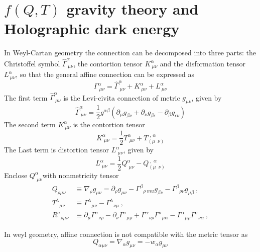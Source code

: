 \documentclass[linenumbers]{aastex631}
\begin{document}
\section{$f(Q,T)$ gravity theory and Holographic dark energy}
In Weyl-Cartan geometry the connection can be decomposed into three parts: the Christoffel symbol $\hat{\Gamma}^\alpha_{\ \mu \nu}$, the contortion tensor $K^\alpha_{\ \mu \nu}$ and the disformation tensor $L^\alpha_{\ \mu \nu}$, so that the general affine connection can be expressed as
\begin{equation}
    \Gamma^\alpha_{\ \mu \nu}=\hat{\Gamma}^\alpha_{\ \mu \nu}+K^\alpha_{\ \mu \nu}+L^\alpha_{\ \mu \nu}
\end{equation}
The first term $\hat{\Gamma}^\alpha_{\ \mu \nu}$ is the Levi-civita connection of metric $g_{\mu\nu}$, given by
\begin{equation}
\hat{\Gamma}^\alpha_{\ \mu \nu}=\frac{1}{2}g^{\alpha \beta}(\partial_\mu g_{\beta \nu}+\partial_\nu g_{\beta \epsilon}-\partial_\beta g_{\epsilon \nu})
\end{equation}
The second term $K^\alpha_{\ \mu \nu}$ is the contortion tensor 
\begin{equation}
 K^{\alpha}_{\,\,\mu\nu} =\frac{1}{2}T^{\alpha}_{\,\,\mu\nu} +T^{\,\ ,\,\alpha}_{(\mu\,\,\,\nu)}
\end{equation}
The Last term is distortion tensor $L^{\alpha}_{\,\,\mu\nu}$, given by
\begin{equation}
L^{\alpha}_{\,\,\mu\nu} = \frac{1}{2}Q^{\alpha}_{\,\,\mu\nu}-Q^{\ ,\,\,\alpha}_{(\mu\,\,\,\nu)}
\end{equation}
Enclose $Q^{\alpha}_{\,\,\mu\nu}$with nonmetricity tensor
\begin{align}
Q_{\rho \mu\nu} &\equiv \nabla_{\rho} g_{\mu\nu} = \partial_\rho g_{\mu\nu} - \Gamma^\beta{}_{\rho\ mu} g_{\beta\nu} - \Gamma^\beta{}_{\rho\nu} g_{\mu\beta}~, \\
T^{\lambda}{}_{\mu\nu} &\equiv
 \Gamma^{\lambda}{}_{\mu\nu}\!-\!\Gamma^{\lambda}{}_{\nu\mu}~ ,\\
 R^{\sigma}{}_{\rho\mu\nu} &\equiv \partial_{\mu} \Gamma^{\sigma}{}_{\nu\rho}\! - \! \partial_{\nu} \Gamma^{\sigma}{}_{\mu\rho}\! +\! \Gamma^{\alpha}{}_{\nu\rho} \Gamma^{\sigma}{}_{\mu\alpha} \!-\!\Gamma^{\alpha}{}_{\mu \rho} \Gamma^{\sigma}{}_{\nu\alpha}~ ,
\end{align}

In weyl geometry, affine connection is not compatible with the metric tensor as 
\begin{equation}
    Q_{\alpha \mu \nu}=\nabla_\alpha g_{\mu \nu}=-w_\alpha g_{\mu \nu}
\end{equation}
\end{document}
